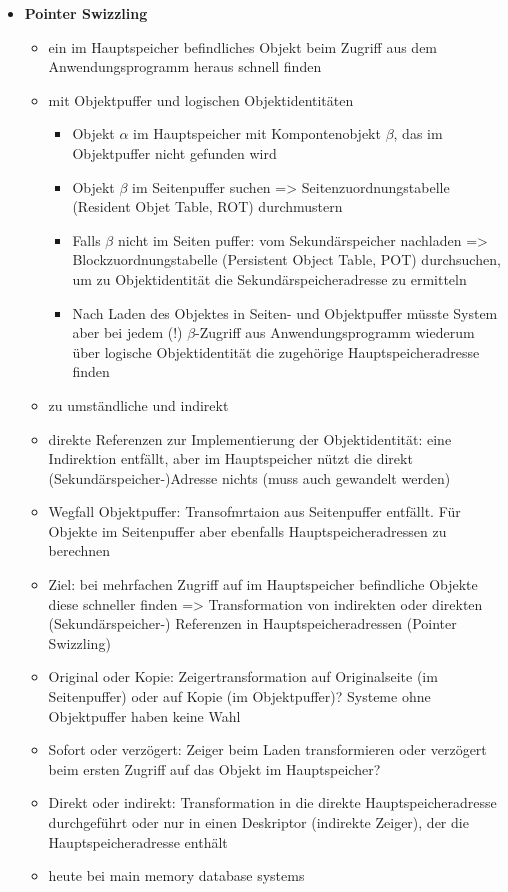 \begin{itemize}
	\item \textbf{Pointer Swizzling}
	\begin{itemize}
		\item ein im Hauptspeicher befindliches Objekt beim Zugriff aus dem Anwendungsprogramm heraus schnell finden
		\item mit Objektpuffer und logischen Objektidentitäten
		\begin{itemize}
			\item Objekt $\alpha$ im Hauptspeicher mit Kompontenobjekt $\beta$, das im Objektpuffer nicht gefunden wird
			\item Objekt $\beta$ im Seitenpuffer suchen => Seitenzuordnungstabelle (Resident Objet Table, ROT) durchmustern
			\item Falls $\beta$ nicht im Seiten puffer: vom Sekundärspeicher nachladen => Blockzuordnungstabelle (Persistent Object Table, POT) durchsuchen, um zu Objektidentität die Sekundärspeicheradresse zu ermitteln
			\item Nach Laden des Objektes in Seiten- und Objektpuffer müsste System aber bei jedem (!) $\beta$-Zugriff aus Anwendungsprogramm wiederum über logische Objektidentität die zugehörige Hauptspeicheradresse finden
		\end{itemize}
		\item zu umständliche und indirekt
		\item direkte Referenzen zur Implementierung der Objektidentität: eine Indirektion entfällt, aber im Hauptspeicher nützt die direkt (Sekundärspeicher-)Adresse nichts (muss auch gewandelt werden)
		\item Wegfall Objektpuffer: Transofmrtaion aus Seitenpuffer entfällt. Für Objekte im Seitenpuffer aber ebenfalls Hauptspeicheradressen zu berechnen
		\item Ziel: bei mehrfachen Zugriff auf im Hauptspeicher befindliche Objekte diese schneller finden => Transformation von indirekten oder direkten (Sekundärspeicher-) Referenzen in Hauptspeicheradressen (Pointer Swizzling)
		\item Original oder Kopie: Zeigertransformation auf Originalseite (im Seitenpuffer) oder auf Kopie (im Objektpuffer)? Systeme ohne Objektpuffer haben keine Wahl
		\item Sofort oder verzögert: Zeiger beim Laden transformieren oder verzögert beim ersten Zugriff auf das Objekt im Hauptspeicher?
		\item Direkt oder indirekt: Transformation in die direkte Hauptspeicheradresse durchgeführt oder nur in einen Deskriptor (indirekte Zeiger), der die Hauptspeicheradresse enthält
		\item heute bei main memory database systems
	\end{itemize}
\end{itemize}


